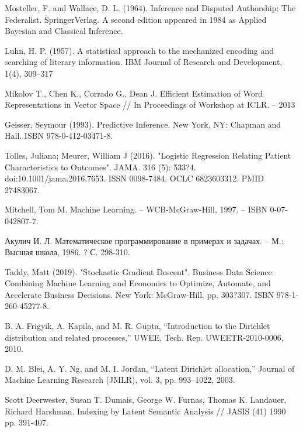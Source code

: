 \documentclass[a4paper,12pt,preview]{report} %
\begin{document}
\begin{thebibliography}{3}
		Mosteller, F. and Wallace, D. L.
		(1964). Inference and Disputed Authorship: The Federalist. SpringerVerlag. A second edition appeared in
		1984 as Applied Bayesian and Classical Inference.
		
		Luhn, H. P. (1957). A statistical approach to the mechanized encoding
		and searching of literary information.
		IBM Journal of Research and Development, 1(4), 309--317
		
		Mikolov T., Chen K., Corrado G., Dean J. Efficient Estimation of Word Representations in Vector Space // In Proceedings of Workshop at ICLR. -- 2013
		
		
		Geisser, Seymour (1993). Predictive Inference. New York, NY: Chapman and Hall. ISBN 978-0-412-03471-8.
		
		Tolles, Juliana; Meurer, William J (2016). "Logistic Regression Relating Patient Characteristics to Outcomes". JAMA. 316 (5): 533?4. doi:10.1001/jama.2016.7653. ISSN 0098-7484. OCLC 6823603312. PMID 27483067.
		
		
		Mitchell, Tom M. Machine Learning. -- WCB-McGraw-Hill, 1997. -- ISBN 0-07-042807-7.
		
		Акулич И. Л. Математическое программирование в примерах и задачах. -- М.: Высшая школа, 1986. ? С. 298-310.
		
		 Taddy, Matt (2019). "Stochastic Gradient Descent". Business Data Science: Combining Machine Learning and Economics to Optimize, Automate, and Accelerate Business Decisions. New York: McGraw-Hill. pp. 303?307. ISBN 978-1-260-45277-8.
		
		B. A. Frigyik, A. Kapila, and M. R. Gupta, “Introduction to the Dirichlet distribution and
		related processes,” UWEE, Tech. Rep. UWEETR-2010-0006, 2010.
		
		D. M. Blei, A. Y. Ng, and M. I. Jordan, “Latent Dirichlet allocation,” Journal of Machine
		Learning Research (JMLR), vol. 3, pp. 993–1022, 2003.
		
		Scott Deerwester, Susan T. Dumais, George W. Furnas, Thomas K. Landauer, Richard Harshman. Indexing by Latent Semantic Analysis // JASIS (41) 1990 pp. 391-407.
		
		
		
	\end{thebibliography}	
	
	
\end{document}
